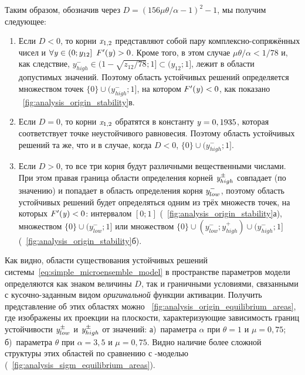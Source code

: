 Таким образом, обозначив через $D = \left( 156 \mu \theta / \alpha - 1\right)^{2} - 1$, мы получим следующее:
\begin{enumerate}[wide]
    \item Если $D < 0$, то корни $\mathit{x}_{1,2}$ представляют собой пару комплексно-сопряжённых чисел и $\forall\scalar{y} \in \left(0; y_{12}\right]\ F^{\prime}(\scalar{y}) > 0$. Кроме того, в этом случае $\mu \theta / \alpha < 1 / 78$ и, как следствие, $y_{high}^{-} \in (1 - \sqrt{z_{12} / 78}; 1] \subset (y_{12}; 1]$, \ie лежит в области допустимых значений. Поэтому область устойчивых решений определяется множеством точек $\{0\} \cup (y_{high}^{-}; 1]$, на котором $F^{\prime}(\mathit{y}) < 0$, как показано \onfigure~\ref{fig:analysis_origin_stability}в.
    \item Если $D = 0$, то корни $\mathit{x}_{1,2}$ обратятся в константу $\mathit{y} = 0,1935$, которая соответствует точке неустойчивого равновесия. Поэтому область устойчивых решений та же, что и в случае, когда $D < 0$, \ie $\{0\} \cup (y_{high}^{-}; 1]$.
    \item Если $D > 0$, то все три корня будут различными вещественными числами. При этом правая граница области определения корней $\mathit{y}^{\pm}_{high}$ совпадает (по значению) и попадает в область определения корня $\mathit{y}^{-}_{low}$, поэтому область устойчивых решений будет определяться одним из трёх множеств точек, на которых $F^{\prime}(\mathit{y}) < 0$: интервалом $[0; 1]$ (\seefigure~\ref{fig:analysis_origin_stability}а), множеством $\{0\} \cup (y_{low}^{-}; 1]$ или множеством $\{0\} \cup (y_{low}^{-}; y_{high}^{+}) \cup (y_{high}^{-}; 1]$ (\seefigure~\ref{fig:analysis_origin_stability}б).
\end{enumerate}

Как видно, области существования устойчивых решений системы~\eqref{eq:simple_microensemble_model} в пространстве параметров модели определяются как знаком величины $D$, так и граничными условиями, связанными с кусочно-заданным видом \textit{оригинальной} функции активации. Получить представление об этих областях можно \onfigure~\ref{fig:analysis_origin_equilibrium_areas}, где изображены их проекции на плоскости, характеризующие зависимость границ устойчивости $\mathit{y}_{low}^{\pm}$ и $\mathit{y}_{high}^{\pm}$ от значений: а)~параметра $\alpha$ при $\theta = 1$ и $\mu = 0,75$; б)~параметра $\theta$ при $\alpha = 3,5$ и $\mu = 0,75$. Видно наличие более сложной структуры этих областей по сравнению с -моделью (\seefigure~\ref{fig:analysis_sigm_equilibrium_areas}).

